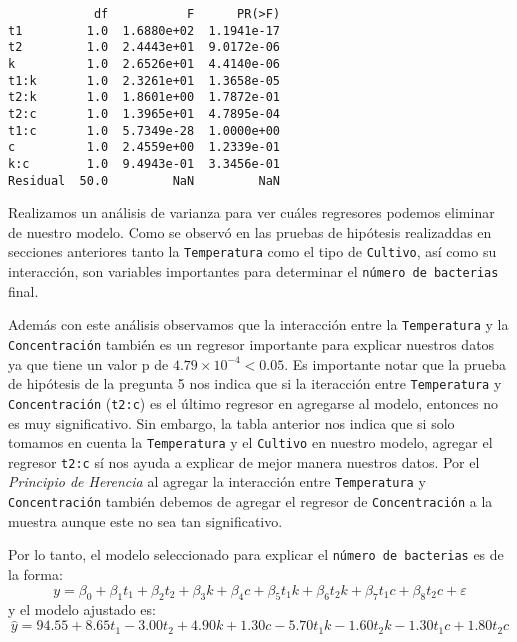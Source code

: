 \documentclass[10pt, spanish]{article}
\begin{document}
    
    \begin{verbatim}
            df           F      PR(>F)
t1         1.0  1.6880e+02  1.1941e-17
t2         1.0  2.4443e+01  9.0172e-06
k          1.0  2.6526e+01  4.4140e-06
t1:k       1.0  2.3261e+01  1.3658e-05
t2:k       1.0  1.8601e+00  1.7872e-01
t2:c       1.0  1.3965e+01  4.7895e-04
t1:c       1.0  5.7349e-28  1.0000e+00
c          1.0  2.4559e+00  1.2339e-01
k:c        1.0  9.4943e-01  3.3456e-01
Residual  50.0         NaN         NaN
    \end{verbatim}

    
    Realizamos un análisis de varianza para ver cuáles regresores podemos
eliminar de nuestro modelo. Como se observó en las pruebas de hipótesis
realizaddas en secciones anteriores tanto la \texttt{Temperatura} como
el tipo de \texttt{Cultivo}, así como su interacción, son variables
importantes para determinar el \texttt{número\ de\ bacterias} final.

Además con este análisis observamos que la interacción entre la
\texttt{Temperatura} y la \texttt{Concentración} también es un regresor
importante para explicar nuestros datos ya que tiene un valor p de
\(4.79 \times 10 ^{-4} < 0.05\). Es importante notar que la prueba de
hipótesis de la pregunta 5 nos indica que si la iteracción entre
\texttt{Temperatura} y \texttt{Concentración} (\texttt{t2:c}) es el
último regresor en agregarse al modelo, entonces no es muy
significativo. Sin embargo, la tabla anterior nos indica que si solo
tomamos en cuenta la \texttt{Temperatura} y el \texttt{Cultivo} en
nuestro modelo, agregar el regresor \texttt{t2:c} sí nos ayuda a
explicar de mejor manera nuestros datos. Por el \emph{Principio de
Herencia} al agregar la interacción entre \texttt{Temperatura} y
\texttt{Concentración} también debemos de agregar el regresor de
\texttt{Concentración} a la muestra aunque este no sea tan
significativo.

    Por lo tanto, el modelo seleccionado para explicar el
\texttt{número\ de\ bacterias} es de la forma:
\[y=\beta_0 + \beta_1 t_1 + \beta_2 t_2 + \beta_3 k + \beta_4 c + \beta_5 t_1k + \beta_6 t_2k + \beta_7 t_1c + \beta_8 t_2c + \varepsilon\]
y el modelo ajustado es:
\[\hat{y}= 94.55 + 8.65t_1 - 3.00t_2 + 4.90k + 1.30c - 5.70t_1k -1.60t_2k - 1.30t_1c + 1.80t_2c \]

    \begin{center}
    \end{center}
    
\end{document}
